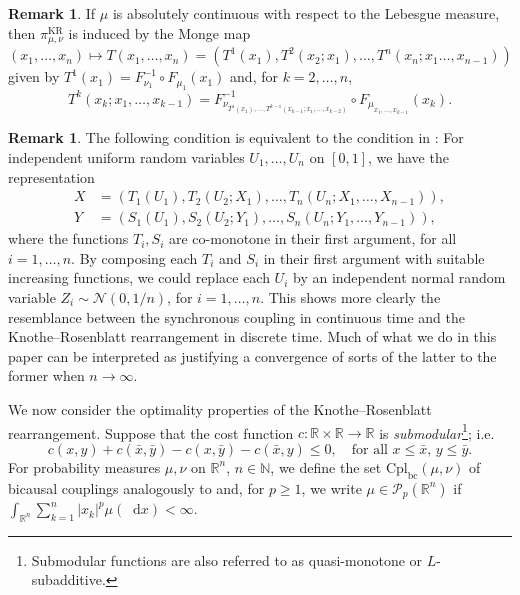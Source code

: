 \documentclass[oneside]{amsart}
\theoremstyle{definition}
\newtheorem{remark}[theorem]{Remark}
\newcommand{\N}{\mathbb N}
\newcommand{\R}{\mathbb R}
\newcommand{\Pc}{\mathcal P}
\newcommand{\cpl}{\mathrm{Cpl}}
\newcommand{\cplba}{\cpl_{\mathrm{bc}}}
\newcommand{\kr}{\mathrm{KR}}
\newcommand{\D}{\mathop{}\!\mathrm{d}}
\def\R{{\mathbb R}}
\numberwithin{equation}{section}
\begin{document}
\begin{remark}\label{rem:monge-kr}
	If $\mu$ is absolutely continuous with respect to the Lebesgue measure, then $\pi^\kr_{\mu, \nu}$ is induced by the Monge map $(x_1, \dotsc, x_n) \mapsto T(x_1, \dotsc, x_n) = (T^1(x_1), T^2(x_2; x_1), \dotsc, T^n(x_n; x_1 \dotsc, x_{n-1}))$ given by $T^1(x_1) = F_{\nu_1}^{-1} \circ F_{\mu_1}(x_1)$ and, for $k = 2, \dotsc, n$,
	\begin{equation}
		T^k(x_k; x_1, \dotsc, x_{k-1}) = F^{-1}_{\nu_{T^1(x_1), \dotsc, T^{k - 1}(x_{k - 1}; x_1, \dotsc, x_{k - 2})}}\circ F_{\mu_{x_1, \dotsc, x_{k - 1}}}(x_k).
	\end{equation}
\end{remark}


\begin{remark}\label{rem:kr-increasing-map}
	The following condition is equivalent to the condition in : For independent uniform random variables $U_1, \dotsc, U_n$ on $[0, 1]$, we have the representation
	\begin{equation}
		\begin{split}
			X & = (T_1(U_1), T_2(U_2; X_1), \dotsc, T_n(U_n; X_1, \dotsc, X_{n - 1})),\\
			Y & = (S_1(U_1), S_2(U_2; Y_1), \dotsc, S_n(U_n; Y_1, \dotsc, Y_{n-1})),
		\end{split}
	\end{equation}
	where the functions $T_i, S_i$ are co-monotone in their first argument, for all $i = 1, \dotsc, n$. By composing each $T_i$ and $S_i$ in their first argument with suitable increasing functions, we could replace each $U_i$ by an independent normal random variable $Z_i\sim\mathcal N(0,1/n)$, for $i= 1, \dotsc, n$. This shows more clearly the resemblance between the synchronous coupling in continuous time and the Knothe--Rosenblatt rearrangement in discrete time. Much of what we do in this paper can be interpreted as justifying a convergence of sorts of the latter to the former when $n\to\infty$.
\end{remark}

We now consider the optimality properties of the Knothe--Rosenblatt rearrangement.
Suppose that the cost function $c \colon \R \times \R \to \R$ is \emph{submodular}\footnote{Submodular functions are also referred to as quasi-monotone or $L$-subadditive.}; i.e.
\begin{equation}\label{eq:L_superadditivity}
	c(x,y)+c(\bar x,\bar y)-c(x,\bar y)- c(\bar x,y)\le 0,
	\quad \textrm{for all $x\le \bar x$, $y\le \bar y$}.
\end{equation}
For probability measures $\mu, \nu$ on $\R^n$, $n \in \N$, we define the set $\cplba(\mu, \nu)$ of bicausal couplings analogously to  and, for $p \geq 1$, we write $\mu \in \Pc_p(\R^n)$ if $\int_{\R^n}\sum_{k = 1}^{n} |x_k|^p \mu(\D x) < \infty$.
\end{document}
